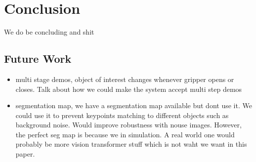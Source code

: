 \chapter{Conclusion}
We do be concluding and shit

\section{Future Work}
\begin{itemize}
    \item multi stage demos, object of interest changes whenever gripper opens or closes. Talk about how we could make the system accept multi step demos

    \item segmentation map, we have a segmentation map available but dont use it. We could use it to prevent keypoints matching to different objects such as background noise. Would improve robustness with nouse images. However, the perfect seg map is because we in simulation. A real world one would probably be more vision transformer stuff which is not waht we want in this paper.
\end{itemize}